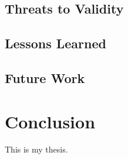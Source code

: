 \documentclass{uvamscse}
\begin{document}
\section{Threats to Validity}

\section{Lessons Learned}

\section{Future Work}





\chapter{Conclusion}

This is my thesis.



{%


}


\newpage
\appendix
\end{document}
